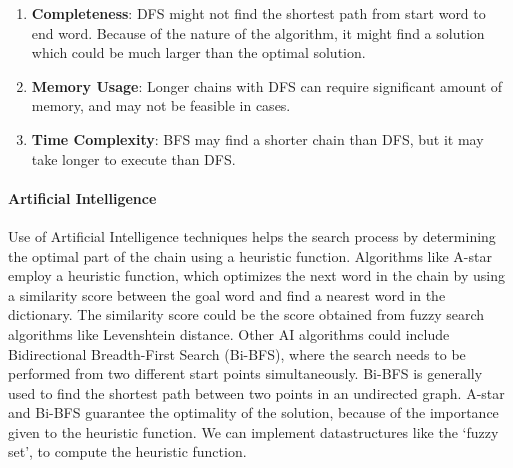 \documentclass{article}
\begin{document}
\begin{enumerate}
    \item \textbf{Completeness}: DFS might not find the shortest path from start word to end word. Because of the nature of the algorithm, it might find a solution which could be much larger than the optimal solution.
    \item \textbf{Memory Usage}: Longer chains with DFS can require significant amount of memory, and may not be feasible in cases.
    \item \textbf{Time Complexity}: BFS may find a shorter chain than DFS, but it may take longer to execute than DFS.  
\end{enumerate}

\paragraph*{Artificial Intelligence} Use of Artificial Intelligence techniques helps the search process by determining the optimal part of the chain using a heuristic function. Algorithms like A-star employ a heuristic function, which optimizes the next word in the chain by using a similarity score between the goal word and find a nearest word in the dictionary. The similarity score could be the score obtained from fuzzy search algorithms like Levenshtein distance. Other AI algorithms could include Bidirectional Breadth-First Search (Bi-BFS), where the search needs to be performed from two different start points simultaneously. Bi-BFS is generally used to find the shortest path between two points in an undirected graph. A-star and Bi-BFS guarantee the optimality of the solution, because of the importance given to the heuristic function. We can implement datastructures like the `fuzzy set', to compute the heuristic function.
\end{document}

